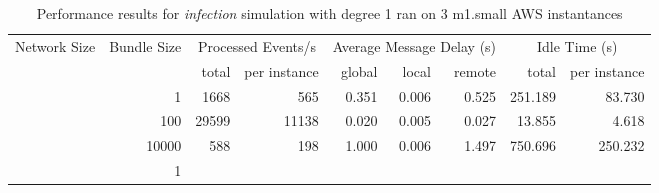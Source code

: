 \begin{table}
	  \caption[Performance results, \emph{infection:1 on 3 m1.small instances }]{ Performance results for \emph{ infection } simulation with degree 1 ran on 3 m1.small AWS instantances }
	\begin{tabular}{rrrrrrrrr}
	\hline\noalign{\smallskip}

	Network Size &
	Bundle Size &
	\multicolumn{2}{c}{Processed Events/s} & 
	\multicolumn{3}{c}{Average Message Delay (s)} & 
	\multicolumn{2}{c}{Idle Time (s)}  \\

	 & 
	 & 
	 total & per instance
     & global & local & remote
     & total & per instance\\

			
				\noalign{\smallskip}\hline
				\multirow{ 3 }{*}{ 40000 } &
				
					
					 
					\multirow{ 1 }{*}{ 1 } &
					
						
							    
							     1668  & 565  
	                           & 0.351 & 0.006 & 0.525
	                           & 251.189 & 83.730  \\
	                
	            
					 &  
					 
					\multirow{ 1 }{*}{ 100 } &
					
						
							    
							     29599  & 11138  
	                           & 0.020 & 0.005 & 0.027
	                           & 13.855 & 4.618  \\
	                
	            
					 &  
					 
					\multirow{ 1 }{*}{ 10000 } &
					
						
							    
							     588  & 198  
	                           & 1.000 & 0.006 & 1.497
	                           & 750.696 & 250.232  \\
	                
	            
	        
				\noalign{\smallskip}\hline
				\multirow{ 3 }{*}{ 80000 } &
				
					
					 
					\multirow{ 1 }{*}{ 1 } &
					

\end{tabular}
\end{table}
